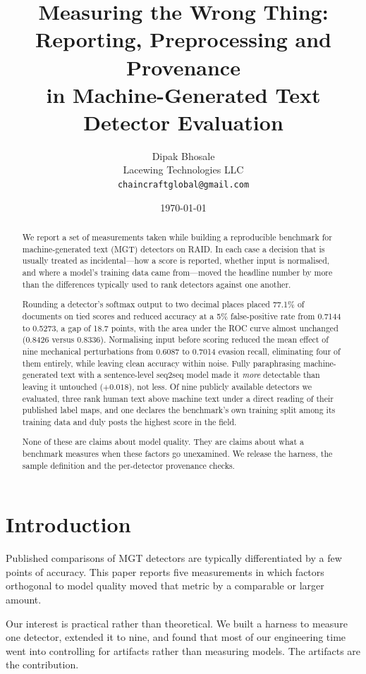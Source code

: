 \documentclass[11pt]{article}
\title{Measuring the Wrong Thing: Reporting, Preprocessing and Provenance\\
in Machine-Generated Text Detector Evaluation}
\author{Dipak Bhosale\\ Lacewing Technologies LLC\\ \texttt{chaincraftglobal@gmail.com}}
\date{\today}
\begin{document}
\maketitle

\begin{abstract}
We report a set of measurements taken while building a reproducible benchmark for
machine-generated text (MGT) detectors on RAID. In each case a decision that is
usually treated as incidental---how a score is reported, whether input is
normalised, and where a model's training data came from---moved the headline
number by more than the differences typically used to rank detectors against one
another.

Rounding a detector's softmax output to two decimal places placed 77.1\% of
documents on tied scores and reduced accuracy at a 5\% false-positive rate from
0.7144 to 0.5273, a gap of 18.7 points, with the area under the ROC curve almost
unchanged (0.8426 versus 0.8336). Normalising input before scoring reduced the
mean effect of nine mechanical perturbations from 0.6087 to 0.7014 evasion
recall, eliminating four of them entirely, while leaving clean accuracy within
noise. Fully paraphrasing machine-generated text with a sentence-level seq2seq
model made it \emph{more} detectable than leaving it untouched ($+0.018$), not
less. Of nine publicly available detectors we evaluated, three rank human text
above machine text under a direct reading of their published label maps, and one
declares the benchmark's own training split among its training data and duly
posts the highest score in the field.

None of these are claims about model quality. They are claims about what a
benchmark measures when these factors go unexamined. We release the harness,
the sample definition and the per-detector provenance checks.
\end{abstract}

\section{Introduction}

Published comparisons of MGT detectors are typically differentiated by a few
points of accuracy. This paper reports five measurements in which factors
orthogonal to model quality moved that metric by a comparable or larger amount.

Our interest is practical rather than theoretical. We built a harness to measure
one detector, extended it to nine, and found that most of our engineering time
went into controlling for artifacts rather than measuring models. The artifacts
are the contribution.
\end{document}
